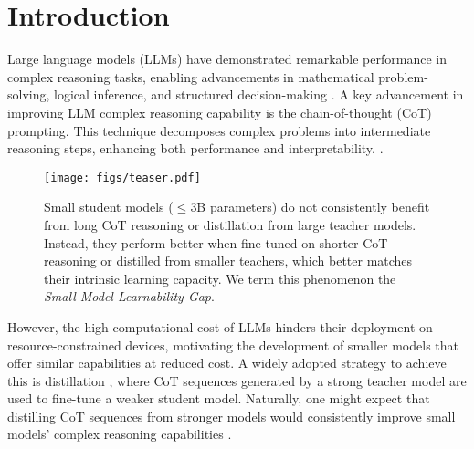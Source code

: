\section{Introduction}





Large language models (LLMs) \citep{anthropic2023claude, brown2020languagemodelsfewshotlearners, openai2023gpt4,touvron2023llamaopenefficientfoundation} have demonstrated remarkable performance in complex reasoning tasks, enabling advancements in mathematical problem-solving, logical inference, and structured decision-making \citep{cobbe2021trainingverifierssolvemath, shao2024deepseekmathpushinglimitsmathematical, yang2024qwen25mathtechnicalreportmathematical}. A key advancement in
improving LLM complex reasoning capability is the chain-of-thought (CoT) prompting. This technique decomposes complex problems into intermediate reasoning steps, enhancing both performance and interpretability. \citep{wei2023chainofthoughtpromptingelicitsreasoning}.

\begin{figure}[h]
    \centering
    \texttt{[image: figs/teaser.pdf]}

    \caption{Small student models ($\leq$3B parameters) do not consistently benefit from long CoT reasoning or distillation from large teacher models. Instead, they perform better when fine-tuned on shorter CoT reasoning or distilled from smaller teachers, which better matches their intrinsic learning capacity. We term this phenomenon the \textit{Small Model Learnability Gap}.}
    \label{fig:main}
\end{figure}

However, the high computational cost of LLMs hinders their deployment on resource-constrained devices, motivating the development of smaller models that offer similar capabilities at reduced cost. A widely adopted strategy to achieve this is distillation \citep{agarwal2024onpolicydistillationlanguagemodels, hinton2015distillingknowledgeneuralnetwork, kim2024promptkddistillingstudentfriendlyknowledge}, where CoT sequences generated by a strong teacher model are used to fine-tune a weaker student model.
Naturally, one might expect that distilling CoT sequences from stronger models would consistently improve small models' complex reasoning capabilities \citep{agarwal2024onpolicydistillationlanguagemodels, deepseekai2024deepseekv3technicalreport, min2024imitateexploreselfimprovereproduction, tunstall2023zephyrdirectdistillationlm}.  



